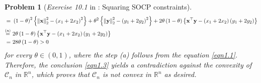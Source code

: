 \documentclass[11pt]{article}
\newtheorem{problem}{Problem}
\numberwithin{equation}{problem}
\begin{document}
\begin{problem} [\emph{Exercise 10.1} in \cite{calafiore2014optimization}: Squaring SOCP constraints]
{\begin{equation}
\begin{split}
        = \ & \left( 1 - \theta \right)^2 \left\{ \left\| \mathbf{x} \right\|_{2}^2 - \left( x_1 + 2 x_2 \right)^2 \right\} + \theta^2 \left\{ \left\| \mathbf{y} \right\|_{2}^2 - \left( y_1 + 2 y_2 \right)^2 \right\} + 2 \theta \left( 1 - \theta \right) \left\{ \mathbf{x}^{\top} \mathbf{y} - \left( x_1 + 2 x_2 \right) \left( y_1 + 2 y_2 \right) \right\} \\
        \stackrel{\textnormal{(a)}}{=} \ & 2 \theta \left( 1 - \theta \right) \left\{ \mathbf{x}^{\top} \mathbf{y} - \left( x_1 + 2 x_2 \right) \left( y_1 + 2 y_2 \right) \right\} \\ 
        = \ & 28 \theta \left( 1 - \theta \right) > 0 \\
    \end{split}
\end{equation}
for every $\theta \in \left( 0, 1 \right)$, where the step (a) follows from the equation \eqref{eqn1.1}. Therefore, the conclusion \eqref{eqn1.3} yields a contradiction against the convexity of $\mathcal{C}_n$ in $\mathbb{R}^n$, which proves that $\mathcal{C}_n$ is not convex in $\mathbb{R}^n$ as desired.
}
\end{problem}
\end{document}

